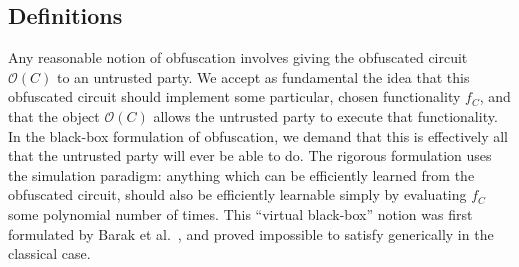 \documentclass[11pt]{article}
\numberwithin{equation}{section}
\newcommand{\algo}{\mathcal}
\begin{document}
{\subsection{Definitions}\label{sec:vbb-definitions}

Any reasonable notion of obfuscation involves giving the obfuscated circuit $\algo O(C)$ to an untrusted party. We accept as fundamental the idea that this obfuscated circuit should implement some particular, chosen functionality $f_C$, and that the object $\algo O(C)$ allows the untrusted party to execute that functionality. In the black-box formulation of obfuscation, we demand that this is effectively all that the untrusted party will ever be able to do. The rigorous formulation uses the simulation paradigm: anything which can be efficiently learned from the obfuscated circuit, should also be efficiently learnable simply by evaluating $f_C$ some polynomial number of times. This ``virtual black-box'' notion was first formulated by Barak et al.~\cite{BGIRSVY12}, and proved impossible to satisfy generically in the classical case.

}
\end{document}
